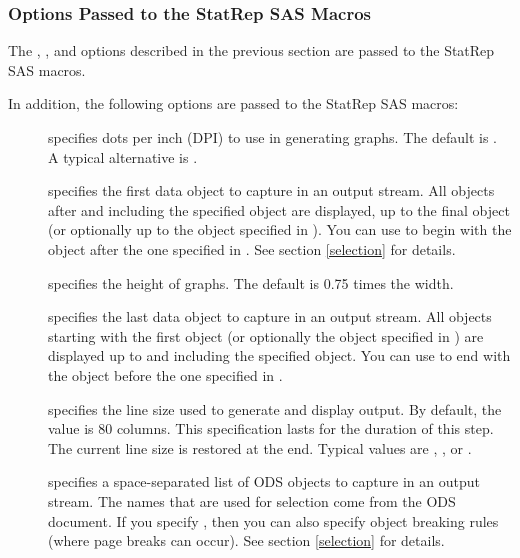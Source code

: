 \documentclass[article,oneside]{memoir}
\newcommand*{\StatRep}{\textsf{StatRep}\xspace}
\begin{document}
  \subsubsection{Options Passed to the  \textsf{StatRep} SAS Macros}\label{sasopts}

The , , and  options described in the previous
section are passed to the \StatRep SAS macros. 

In addition, the following options are passed to the \StatRep SAS macros:
  \begin{description}
    \item[] specifies dots per inch (DPI) to use in generating graphs. 
  The default is . A typical alternative is . 

  \item[] specifies the first data object to capture in an output stream. 
  All objects after and including the specified object 
  are displayed, up to the final object 
 (or optionally up to the object specified in ). 
  You can use  to begin with the object after the one specified in .
  See section \ref{selection} for details.

  \item[] specifies the height of graphs. The default is 0.75 times the width. 

  \item[] specifies the last data object to capture in an output stream. 
  All objects starting with the first object
  (or optionally the object specified in ) are displayed up to and 
  including the specified object. 
  You can use  to end with the object before the one specified in .
 
\item[] specifies the line size used to generate and display
      output. By default, the value is 80 columns. 
     This specification lasts for the duration of this step. The current line size is 
     restored at the end.
     Typical values are , , or .

  \item[] specifies a space-separated list of ODS objects to capture 
  in an output stream. 
  The names that are used for selection come from the ODS document.
  If you specify , then you can also specify object breaking rules 
  (where page breaks can occur). See section \ref{selection} for details.


\end{description}
\end{document}
